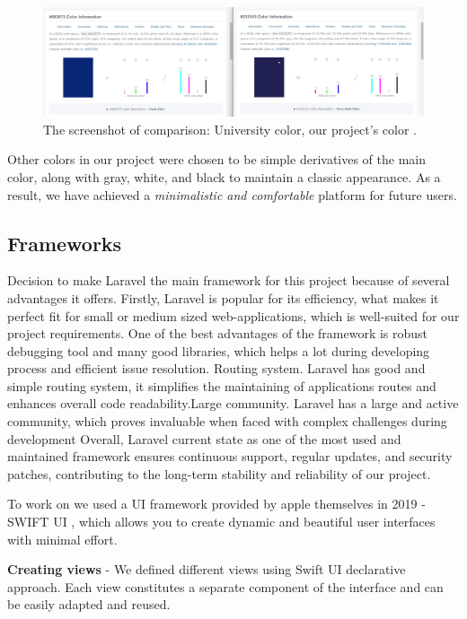 \begin{figure}[ht]\label{fig:colors}
  \centering
  \includegraphics[width=0.8\linewidth]{figures/color comparison.jpg}
  \caption{The screenshot of comparison: University color, our project's color .}
\end{figure}
\newpage
Other colors in our project were chosen to be simple derivatives of the main color, along with gray, white, and black to maintain a classic appearance. As a result, we have achieved a \textit{minimalistic and comfortable} platform for future users.

\subsection{Frameworks}\label{frmw}
\hspace*{0.5cm} Decision to make Laravel \cite{laravel} the main framework for this project because of several advantages it offers. Firstly, Laravel \cite{laravel} is popular for its efficiency, what makes it perfect fit for small or medium sized web-applications, which is well-suited for our project requirements. One of the best advantages of the framework is robust debugging tool and many good libraries, which helps a lot during developing process and efficient issue resolution.
Routing system. Laravel \cite{laravel} has good and simple routing system, it simplifies the maintaining of applications routes and enhances overall code readability.Large community. Laravel \cite{laravel} has a large and active community, which proves invaluable when faced with complex challenges during development
Overall, Laravel \cite{laravel} current state as one of the most used and maintained framework ensures continuous support, regular updates, and security patches, contributing to the long-term stability and reliability of our project.
\par

\hrulefill 

To work on   we used a UI framework provided by apple themselves in 2019 - SWIFT UI \cite{swift}, which allows you to create dynamic and beautiful user interfaces with minimal effort. 

\textbf{Creating views} - We defined different views using Swift UI \cite{swift} declarative approach. Each view constitutes a separate component of the interface and can be easily adapted and reused.


